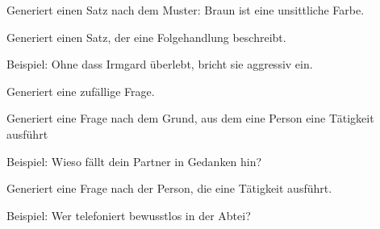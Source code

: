 \documentclass[a4paper,12pt,oneside]{sphinxmanual}
\begin{document}

\begin{fulllineitems}
\label{module:pyzufall.satz.satz_farbe}
Generiert einen Satz nach dem Muster: Braun ist eine unsittliche Farbe.

\end{fulllineitems}


\begin{fulllineitems}
\label{module:pyzufall.satz.satz_folgehandlung}
Generiert einen Satz, der eine Folgehandlung beschreibt.

Beispiel: Ohne dass Irmgard überlebt, bricht sie aggressiv ein.

\end{fulllineitems}


\begin{fulllineitems}
\label{module:pyzufall.satz.satz_frage}
Generiert eine zufällige Frage.

\end{fulllineitems}


\begin{fulllineitems}
\label{module:pyzufall.satz.satz_frage_1}
Generiert eine Frage nach dem Grund, aus dem eine Person eine Tätigkeit ausführt

Beispiel: Wieso fällt dein Partner in Gedanken hin?

\end{fulllineitems}


\begin{fulllineitems}
\label{module:pyzufall.satz.satz_frage_2}
Generiert eine Frage nach der Person, die eine Tätigkeit ausführt.

Beispiel: Wer telefoniert bewusstlos in der Abtei?

\end{fulllineitems}
\end{document}

